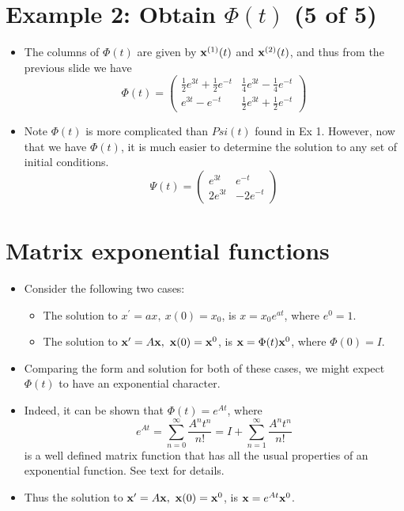 \documentclass[11pt,a4paper]{article}
\begin{document}
	\section*{Example 2: Obtain $\Phi(t)$ (5 of 5)}
	\begin{itemize}
		\item The columns of $\Phi(t)$ are given by $\vb{x}^{(1)}(t)$ and $\vb{x}^{(2)}(t)$, and thus from the previous slide we have
		$$
		\Phi(t) =
		\begin{pmatrix}
			\frac{1}{2}e^{3t} + \frac{1}{2}e^{-t} & \frac{1}{4}e^{3t} - \frac{1}{4}e^{-t}\\
			e^{3t} - e^{-t} & \frac{1}{2}e^{3t} + \frac{1}{2}e^{-t}
		\end{pmatrix}
		$$
		\item Note $\Phi(t)$ is more complicated than $Psi(t)$ found in Ex 1. However, now that we have $\Phi(t)$, it is much easier to determine the solution to any set of initial conditions.
		$$
		\Psi(t) =
		\begin{pmatrix}
			e^{3t} & e^{-t}\\
			2e^{3t} & -2e^{-t}
		\end{pmatrix}
		$$
	\end{itemize}
	\section*{Matrix exponential functions}
	\begin{itemize}
		\item Consider the following two cases:
		\begin{itemize}
			\item[\labelitemi] The solution to $x^\prime = ax,\ x(0) = x_0$, is $x = x_0e^{at}$, where $e^0 = 1$.
			\item[\labelitemi] The solution to $\vb{x}^\prime = A\vb{x},\ \vb{x}(0) = \vb{x}^0$, is $\vb{x} = \Phi(t)\vb{x}^0$, where $\Phi(0) = I$. 
		\end{itemize}
		\item Comparing the form and solution for both of these cases, we might expect $\Phi(t)$ to have an exponential character.
		\item Indeed, it can be shown that $\Phi(t) = e^{At}$, where
		$$
		e^{At} = \sum_{n=0}^{\infty}\frac{A^nt^n}{n!} = I+\sum_{n=1}^{\infty}\frac{A^nt^n}{n!}
		$$
		is a well defined matrix function that has all the usual properties of an exponential function. See text for details.
		\item Thus the solution to $\vb{x}^\prime = A\vb{x},\ \vb{x}(0) = \vb{x}^0$, is $\vb{x} = e^{At}\vb{x}^0$. 
	\end{itemize}
\end{document}
